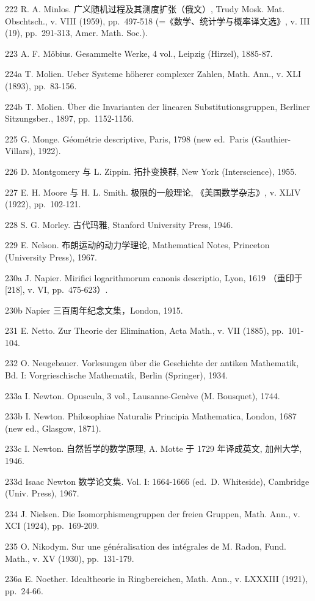 222 R. A. Minlos. 广义随机过程及其测度扩张（俄文）, Trudy Mosk. Mat. Obschtsch., v. VIII (1959), pp.~497-518 (=《数学、统计学与概率译文选》, v. III (19), pp.~291-313, Amer. Math. Soc.).

223 A. F. Möbius. Gesammelte Werke, 4 vol., Leipzig (Hirzel), 1885-87.

224a T. Molien. Ueber Systeme höherer complexer Zahlen, Math. Ann., v. XLI (1893), pp.~83-156.

224b T. Molien. Über die Invarianten der linearen Substitutionsgruppen, Berliner Sitzungsber., 1897, pp.~1152-1156.

225 G. Monge. Géométrie descriptive, Paris, 1798 (new ed.~Paris (Gauthier-Villars), 1922).

226 D. Montgomery 与 L. Zippin. 拓扑变换群, New York (Interscience), 1955.

227 E. H. Moore 与 H. L. Smith. 极限的一般理论, 《美国数学杂志》, v. XLIV (1922), pp.~102-121.

228 S. G. Morley. 古代玛雅, Stanford University Press, 1946.

229 E. Nelson. 布朗运动的动力学理论, Mathematical Notes, Princeton (University Press), 1967.

230a J. Napier. Mirifici logarithmorum canonis descriptio, Lyon, 1619 （重印于 {[}218{]}, v. VI, pp.~475-623）.

230b Napier 三百周年纪念文集，London, 1915.

231 E. Netto. Zur Theorie der Elimination, Acta Math., v. VII (1885), pp.~101-104.

232 O. Neugebauer. Vorlesungen über die Geschichte der antiken Mathematik, Bd. I: Vorgrieschische Mathematik, Berlin (Springer), 1934.

233a I. Newton. Opuscula, 3 vol., Lausanne-Genève (M. Bousquet), 1744.

233b I. Newton. Philosophiae Naturalis Principia Mathematica, London, 1687 (new ed., Glasgow, 1871).

233c I. Newton. 自然哲学的数学原理, A. Motte 于 1729 年译成英文, 加州大学, 1946.

233d Isaac Newton 数学论文集. Vol. I: 1664-1666 (ed.~D. Whiteside), Cambridge (Univ. Press), 1967.

234 J. Nielsen. Die Isomorphismengruppen der freien Gruppen, Math. Ann., v. XCI (1924), pp.~169-209.

235 O. Nikodym. Sur une généralisation des intégrales de M. Radon, Fund. Math., v. XV (1930), pp.~131-179.

236a E. Noether. Idealtheorie in Ringbereichen, Math. Ann., v. LXXXIII (1921), pp.~24-66.

